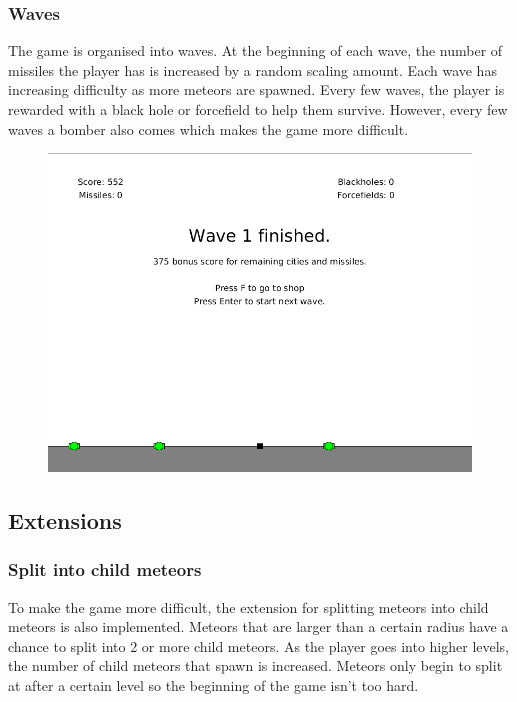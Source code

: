 \documentclass{article}
\begin{document}
\subsubsection*{Waves}
The game is organised into waves. At the beginning of each wave, the number of missiles the player has is increased by a random scaling amount. Each wave has increasing difficulty as more meteors are spawned. Every few waves, the player is rewarded with a black hole or forcefield to help them survive. However, every few waves a bomber also comes which makes the game more difficult.
\begin{figure}[H]
\centering
\includegraphics[width=1\textwidth, keepaspectratio]{imgs/WaveFinished.png}
\end{figure}


\subsection{Extensions}

\subsubsection*{Split into child meteors}
To make the game more difficult, the extension for splitting meteors into child meteors is also implemented. Meteors that are larger than a certain radius have a chance to split into 2 or more child meteors. As the player goes into higher levels, the number of child meteors that spawn is increased. Meteors only begin to split at after a certain level so the beginning of the game isn't too hard. 
\end{document}
